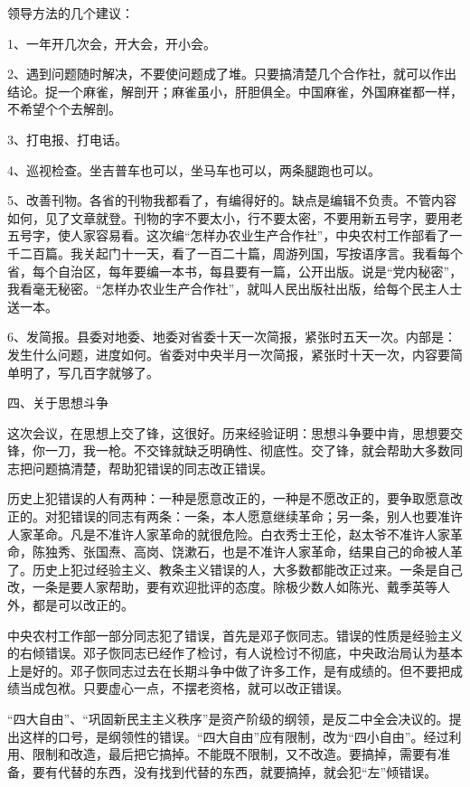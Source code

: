 领导方法的几个建议：

1、一年开几次会，开大会，开小会。

2、遇到问题随时解决，不要使问题成了堆。只要搞清楚几个合作社，就可以作出结论。捉一个麻雀，解剖开；麻雀虽小，肝胆俱全。中国麻雀，外国麻崔都一样，不希望个个去解剖。

3、打电报、打电话。

4、巡视检查。坐吉普车也可以，坐马车也可以，两条腿跑也可以。

5、改善刊物。各省的刊物我都看了，有编得好的。缺点是编辑不负责。不管内容如何，见了文章就登。刊物的字不要太小，行不要太密，不要用新五号字，要用老五号字，使人家容易看。这次编“怎样办农业生产合作社”，中央农村工作部看了一千二百篇。我关起门十一天，看了一百二十篇，周游列国，写按语序言。我看每个省，每个自治区，每年要编一本书，每县要有一篇，公开出版。说是“党内秘密”，我看毫无秘密。“怎样办农业生产合作社”，就叫人民出版社出版，给每个民主人士送一本。

6、发简报。县委对地委、地委对省委十天一次简报，紧张时五天一次。内部是：发生什么问题，进度如何。省委对中央半月一次简报，紧张时十天一次，内容要简单明了，写几百字就够了。

四、关于思想斗争

这次会议，在思想上交了锋，这很好。历来经验证明：思想斗争要中肯，思想要交锋，你一刀，我一枪。不交锋就缺乏明确性、彻底性。交了锋，就会帮助大多数同志把问题搞清楚，帮助犯错误的同志改正错误。

历史上犯错误的人有两种：一种是愿意改正的，一种是不愿改正的，要争取愿意改正的。对犯错误的同志有两条：一条，本人愿意继续革命；另一条，别人也要准许人家革命。凡是不准许人家革命的就很危险。白衣秀士王伦，赵太爷不准许人家革命，陈独秀、张国焘、高岗、饶漱石，也是不准许人家革命，结果自己的命被人革了。历史上犯过经验主义、教条主义错误的人，大多数都能改正过来。一条是自己改，一条是要人家帮助，要有欢迎批评的态度。除极少数人如陈光、戴季英等人外，都是可以改正的。

中央农村工作部一部分同志犯了错误，首先是邓子恢同志。错误的性质是经验主义的右倾错误。邓子恢同志已经作了检讨，有人说检讨不彻底，中央政治局认为基本上是好的。邓子恢同志过去在长期斗争中做了许多工作，是有成绩的。但不要把成绩当成包袱。只要虚心一点，不摆老资格，就可以改正错误。

“四大自由”、“巩固新民主主义秩序”是资产阶级的纲领，是反二中全会决议的。提出这样的口号，是纲领性的错误。“四大自由”应有限制，改为“四小自由”。经过利用、限制和改造，最后把它搞掉。不能既不限制，又不改造。要搞掉，需要有准备，要有代替的东西，没有找到代替的东西，就要搞掉，就会犯“左”倾错误。

